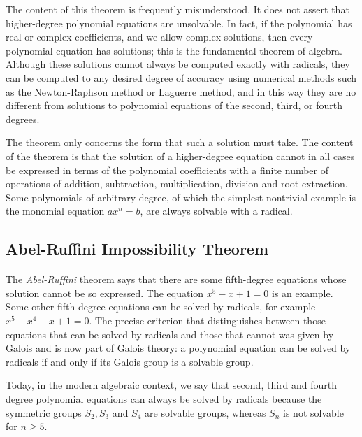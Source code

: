 \documentclass[%
oneside,                 %
final,                   %
10pt]{article}
\begin{document}
The content of this theorem is frequently misunderstood. It does not assert that higher-degree polynomial equations are unsolvable. 
In fact, if the polynomial has real or complex coefficients, and we allow complex solutions, then every polynomial equation has solutions; this is the fundamental theorem of algebra. Although these solutions cannot always be computed exactly with radicals, they can be computed to any desired degree of accuracy using numerical methods such as the Newton-Raphson method or Laguerre method, and in this way they are no different from solutions to polynomial equations of the second, third, or fourth degrees.

The theorem only concerns the form that such a solution must take. The content of the theorem is 
that the solution of a higher-degree equation cannot in all cases be expressed in terms of the polynomial coefficients with a finite number of operations of addition, subtraction, multiplication, division and root extraction. Some polynomials of arbitrary degree, of which the simplest nontrivial example is the monomial equation $ax^n = b$, are always solvable with a radical.



\subsection*{Abel-Ruffini Impossibility Theorem}

\paragraph{}

The \emph{Abel-Ruffini} theorem says that there are some fifth-degree equations whose solution cannot be so expressed. 
The equation $x^5 - x + 1 = 0$ is an example. Some other fifth degree equations can be solved by radicals, 
for example $x^5 - x^4 - x + 1 = 0$. The precise criterion that distinguishes between those equations that can be solved 
by radicals and those that cannot was given by Galois and is now part of Galois theory: 
a polynomial equation can be solved by radicals if and only if its Galois group is a solvable group.

Today, in the modern algebraic context, we say that second, third and fourth degree polynomial 
equations can always be solved by radicals because the symmetric groups $S_2, S_3$ and $S_4$ are solvable groups, 
whereas $S_n$ is not solvable for $n \ge 5$.
\end{document}

